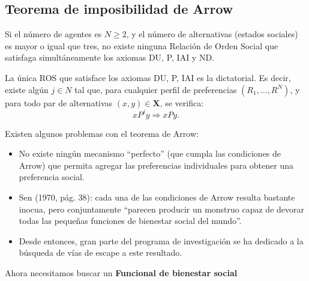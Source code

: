 \subsection{Teorema de imposibilidad de Arrow}
Si el número de agentes es $N\geq 2$, y el número de alternativas (estados sociales) es mayor o igual que tres, no existe ninguna Relación de Orden Social que satisfaga simultáneamente los axiomas DU, P, IAI y ND.

La única ROS que satisface los axiomas DU, P, IAI es la dictatorial. Es decir, existe algún $j\in N$ tal que, para cualquier perfil de preferencias $(R_1,\ldots,R^N)$, y para todo par de alternativas $(x,y)\in \textbf{X}$, se verifica:
$$xP^jy \Rightarrow x P y.$$

Existen algunos problemas con el teorema de Arrow:

\begin{itemize}
    \item No existe ningún mecanismo “perfecto” (que cumpla las condiciones de Arrow) que permita agregar las preferencias individuales para obtener una preferencia social.
    \item  Sen (1970, pág. 38): cada una de las condiciones de Arrow resulta bastante inocua, pero conjuntamente “parecen producir un monstruo capaz de devorar todas las pequeñas funciones de bienestar social del mundo”.
    \item  Desde entonces, gran parte del programa de investigación se ha dedicado a la búsqueda de vías de escape a este resultado.
\end{itemize}


Ahora necesitamos buscar un \textbf{Funcional de bienestar social} 

